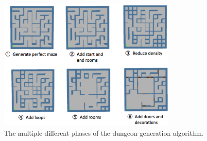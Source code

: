 \begin{figure}[h!]
\centering
 \includegraphics[width=0.8\textwidth]{images/phases-mixed.png}
\caption{The multiple different phases of the dungeon-generation algorithm.}
\end{figure}